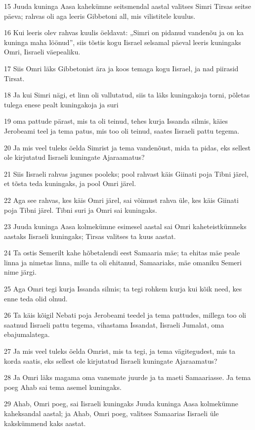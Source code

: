 \par 15 Juuda kuninga Aasa kahekümne seitsmendal aastal valitses Simri Tirsas seitse päeva; rahvas oli aga leeris Gibbetoni all, mis vilistitele kuulus.
\par 16 Kui leeris olev rahvas kuulis öeldavat: „Simri on pidanud vandenõu ja on ka kuninga maha löönud”, siis tõstis kogu Iisrael selsamal päeval leeris kuningaks Omri, Iisraeli väepealiku.
\par 17 Siis Omri läks Gibbetonist ära ja koos temaga kogu Iisrael, ja nad piirasid Tirsat.
\par 18 Ja kui Simri nägi, et linn oli vallutatud, siis ta läks kuningakoja torni, põletas tulega enese pealt kuningakoja ja suri
\par 19 oma pattude pärast, mis ta oli teinud, tehes kurja Issanda silmis, käies Jerobeami teel ja tema patus, mis too oli teinud, saates Iisraeli pattu tegema.
\par 20 Ja mis veel tuleks öelda Simrist ja tema vandenõust, mida ta pidas, eks sellest ole kirjutatud Iisraeli kuningate Ajaraamatus?
\par 21 Siis Iisraeli rahvas jagunes pooleks; pool rahvast käis Giinati poja Tibni järel, et tõsta teda kuningaks, ja pool Omri järel.
\par 22 Aga see rahvas, kes käis Omri järel, sai võimust rahva üle, kes käis Giinati poja Tibni järel. Tibni suri ja Omri sai kuningaks.
\par 23 Juuda kuninga Aasa kolmekümne esimesel aastal sai Omri kaheteistkümneks aastaks Iisraeli kuningaks; Tirsas valitses ta kuus aastat.
\par 24 Ta ostis Semerilt kahe hõbetalendi eest Samaaria mäe; ta ehitas mäe peale linna ja nimetas linna, mille ta oli ehitanud, Samaariaks, mäe omaniku Semeri nime järgi.
\par 25 Aga Omri tegi kurja Issanda silmis; ta tegi rohkem kurja kui kõik need, kes enne teda olid olnud.
\par 26 Ta käis kõigil Nebati poja Jerobeami teedel ja tema pattudes, millega too oli saatnud Iisraeli pattu tegema, vihastama Issandat, Iisraeli Jumalat, oma ebajumalatega.
\par 27 Ja mis veel tuleks öelda Omrist, mis ta tegi, ja tema vägitegudest, mis ta korda saatis, eks sellest ole kirjutatud Iisraeli kuningate Ajaraamatus?
\par 28 Ja Omri läks magama oma vanemate juurde ja ta maeti Samaariasse. Ja tema poeg Ahab sai tema asemel kuningaks.
\par 29 Ahab, Omri poeg, sai Iisraeli kuningaks Juuda kuninga Aasa kolmekümne kaheksandal aastal; ja Ahab, Omri poeg, valitses Samaarias Iisraeli üle kakskümmend kaks aastat.
